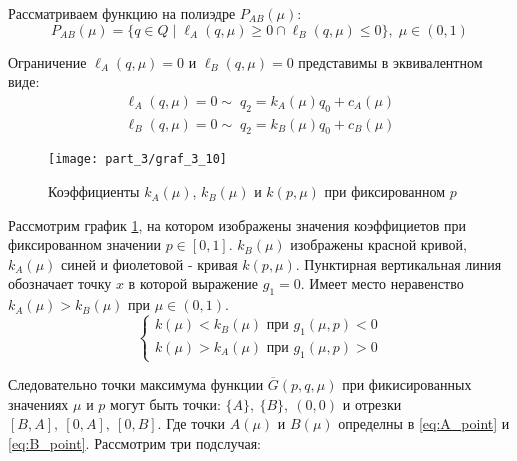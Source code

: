 Рассматриваем функцию на полиэдре $P_{AB}(\mu):$
$$
	P_{AB}(\mu)=
	\{
		q \in Q \; | \;  
		\ell_A(q, \mu) \geqslant 0 \cap
	 	\ell_B(q, \mu) \leqslant 0
	\} , \; \mu \in (0,1)
$$

Ограничение $\ell_A(q, \mu) = 0$ и $\ell_B(q, \mu) = 0$ представимы в 
эквивалентном виде:
\begin{gather*}
	\ell_A(q,\mu)=0 \sim \; q_2=k_A(\mu)q_0+c_A(\mu)
	\\	
	\ell_B(q,\mu)=0 \sim \; q_2=k_B(\mu)q_0+c_B(\mu)
\end{gather*}

	
\begin{figure}[H]
	\centering
  	\texttt{[image: part\_3/graf\_3\_10]}
  	\caption{
  		Коэффициенты $k_A(\mu)$, $k_B(\mu)$ и $k(p,\mu)$ 
  		при фиксированном $p$
  	}
	\label{fig:k_A,k_B,k}	
\end{figure}	
	
Рассмотрим график \ref{fig:k_A,k_B,k}, на котором изображены значения 
коэффициетов при фиксированном значении $p \in [0,1]$. $k_B(\mu)$ изображены 
красной кривой, $k_A(\mu)$ синей и фиолетовой - кривая $k(p, \mu)$. 
Пунктирная вертикальная линия обозначает точку $x$ в которой выражение $g_1=0$.
Имеет место неравенство $k_A(\mu) > k_B(\mu)$ при $\mu \in (0,1)$.
$$
	\begin{cases}
		k(\mu) < k_B(\mu) \textrm{ при } g_1(\mu,p) < 0 \\
		k(\mu) > k_A(\mu) \textrm{ при } g_1(\mu,p) > 0 
	\end{cases}		
$$	
	
Следовательно точки максимума функции $\overline{G}(p,q,\mu)$ при 
фикисированных значениях $\mu$ и $p$ могут быть точки: 
$\{A\}, \: \{B\}, \: (0,0)$ и отрезки $[B, A], \: [0, A], \: [0,B]$. Где точки
$A(\mu)$ и $B(\mu)$ определны в \eqref{eq:A_point} и \eqref{eq:B_point}. 
Рассмотрим три подслучая:

